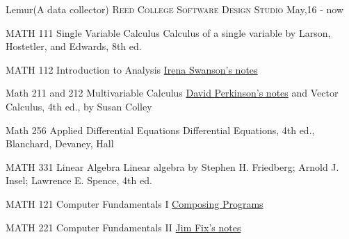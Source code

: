 \documentclass[10pt,a4paper]{article}
\begin{document}

\headedsection
  {Lemur(A data collector)}
  {\textsc{Reed College Software Design Studio}} {%
  \headedsubsection
    {}
    {May,16 - now}
    {}
}

\spacedhrule{0.5em}{-0.4em}

  
   \inlineheadsection  %
  {MATH 111 Single Variable Calculus}
  {Calculus of a single variable by Larson, Hostetler, and Edwards, 8th ed.}
  \vspace{0.5em}

  \inlineheadsection
  {MATH 112 Introduction to Analysis}
  {\href{http://people.reed.edu/~iswanson/analysis.pdf}{Irena Swanson's notes}}
  \vspace{0.5em}
  
  \inlineheadsection
  {Math 211 and 212 Multivariable Calculus}
  {\href{http://people.reed.edu/~davidp/homepage/211.pdf}{David Perkinson's notes} and Vector Calculus, 4th ed., by Susan Colley}
  \vspace{0.5em}
  
   \inlineheadsection
  {Math 256 Applied Differential Equations}
  {Differential Equations, 4th ed., Blanchard, Devaney, Hall}
  \vspace{0.5em}
  
  \inlineheadsection
  {MATH 331 Linear Algebra}
  {	Linear algebra by Stephen H. Friedberg; Arnold J. Insel; Lawrence E. Spence, 4th ed.}
  \vspace{0.5em}
  
  
   \inlineheadsection
  {MATH 121 Computer Fundamentals I}
  {\href{http://www.composingprograms.com/}{Composing Programs}}
  \vspace{0.5em}
  
   \inlineheadsection
  {MATH 221 Computer Fundamentals II}
  {\href{https://jimfix.github.io/math221/index.html}{Jim Fix's notes}}
  \vspace{0.5em}
  
\end{document}

